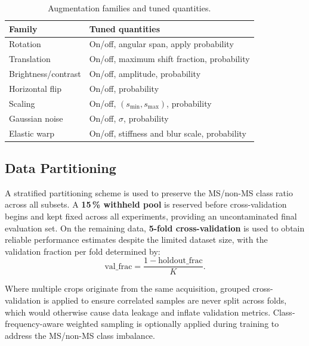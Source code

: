 \begin{table}[htbp]
  \centering
  \caption{Augmentation families and tuned quantities.}
  \label{tab:ataxia_aug_space}
  \small
  \begin{tabular}{ll}
    \toprule
    \textbf{Family} & \textbf{Tuned quantities} \\
    \midrule
    Rotation            & On/off, angular span, apply probability \\
    Translation         & On/off, maximum shift fraction, probability \\
    Brightness/contrast & On/off, amplitude, probability \\
    Horizontal flip     & On/off, probability \\
    Scaling             & On/off, $(s_{\min}, s_{\max})$, probability \\
    Gaussian noise      & On/off, $\sigma$, probability \\
    Elastic warp        & On/off, stiffness and blur scale, probability \\
    \bottomrule
  \end{tabular}
\end{table}

\subsection{Data Partitioning}
\label{subsec:ataxia_splits}

A stratified partitioning scheme is used to preserve the MS/non-MS class ratio across all subsets. A \textbf{15\,\% withheld pool} is reserved before cross-validation begins and kept fixed across all experiments, providing an uncontaminated final evaluation set. On the remaining data, \textbf{5-fold cross-validation} is used to obtain reliable performance estimates despite the limited dataset size, with the validation fraction per fold determined by:
\[
  \mathrm{val\_frac} = \frac{1 - \mathrm{holdout\_frac}}{K}.
\]

Where multiple crops originate from the same acquisition, grouped cross-validation is applied to ensure correlated samples are never split across folds, which would otherwise cause data leakage and inflate validation metrics. Class-frequency-aware weighted sampling is optionally applied during training to address the MS/non-MS class imbalance.

